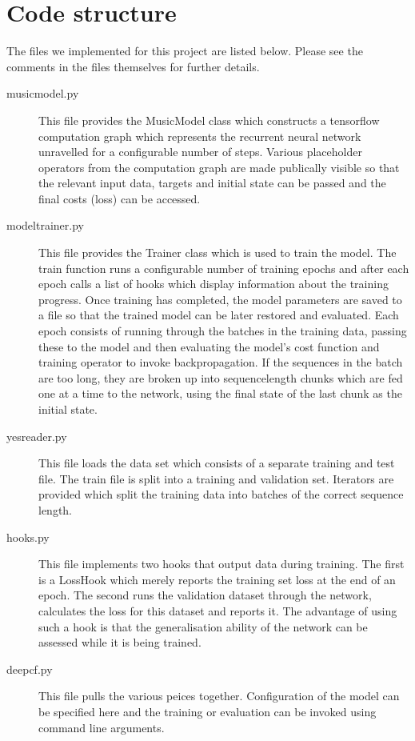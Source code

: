 \documentclass{article} %
\begin{document}
\section{Code structure}
The files we implemented for this project are listed below. Please see the comments in the files themselves for further details. 
\begin{description}
\item [musicmodel.py] This file provides the MusicModel class which constructs a tensorflow computation graph which represents the recurrent neural network unravelled for a configurable number of steps. Various placeholder operators from the computation graph are made publically visible so that the relevant input data, targets and initial state can be passed and the final costs (loss) can be accessed.
\item [modeltrainer.py] This file provides the Trainer class which is used to train the model. The train function runs a configurable number of training epochs and after each epoch calls a list of hooks which display information about the training progress. Once training has completed, the model parameters are saved to a file so that the trained model can be later restored and evaluated. Each epoch consists of running through the batches in the training data, passing these to the model and then evaluating the model's cost function and training operator to invoke backpropagation. If the sequences in the batch are too long, they are broken up into sequence\textunderscore length chunks which are fed one at a time to the network, using the final state of the last chunk as the initial state.
\item [yes\textunderscore reader.py] This file loads the data set which consists of a separate training and test file. The train file is split into a training and validation set. Iterators are provided which split the training data into batches of the correct sequence length. 
\item [hooks.py] This file implements two hooks that output data during training. The first is a LossHook which merely reports the training set loss at the end of an epoch. The second runs the validation dataset through the network, calculates the loss for this dataset and reports it. The advantage of using such a hook is that the generalisation ability of the network can be assessed while it is being trained. 
\item [deepcf.py] This file pulls the various peices together. Configuration of the model can be specified here and the training or evaluation can be invoked using command line arguments.
\end{description}
\end{document}
